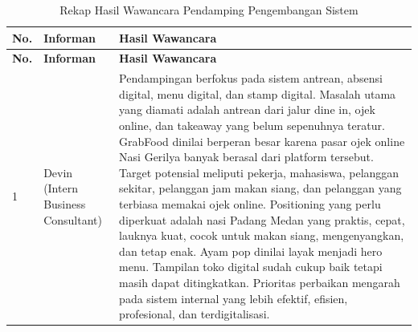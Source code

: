 \begingroup
\scriptsize
\begin{xltabular}{\textwidth}{|C{0.7cm}|L{3.3cm}|Y|}
\caption{Rekap Hasil Wawancara Pendamping Pengembangan Sistem}
\label{tab:rekap-wawancara-pendamping-sistem} \\
\toprule
\textbf{No.} & \textbf{Informan} & \textbf{Hasil Wawancara} \\ \hline
\midrule
\endfirsthead

\toprule
\textbf{No.} & \textbf{Informan} & \textbf{Hasil Wawancara} \\ \hline
\midrule
\endhead

\endfoot

\bottomrule
\endlastfoot

1 & Devin (Intern Business Consultant) & Pendampingan berfokus pada sistem antrean, absensi digital, menu digital, dan stamp digital. Masalah utama yang diamati adalah antrean dari jalur dine in, ojek online, dan takeaway yang belum sepenuhnya teratur. GrabFood dinilai berperan besar karena pasar ojek online Nasi Gerilya banyak berasal dari platform tersebut. Target potensial meliputi pekerja, mahasiswa, pelanggan sekitar, pelanggan jam makan siang, dan pelanggan yang terbiasa memakai ojek online. Positioning yang perlu diperkuat adalah nasi Padang Medan yang praktis, cepat, lauknya kuat, cocok untuk makan siang, mengenyangkan, dan tetap enak. Ayam pop dinilai layak menjadi hero menu. Tampilan toko digital sudah cukup baik tetapi masih dapat ditingkatkan. Prioritas perbaikan mengarah pada sistem internal yang lebih efektif, efisien, profesional, dan terdigitalisasi. \\ \hline
\end{xltabular}
\endgroup

